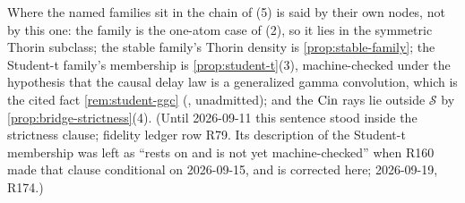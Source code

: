 Where the named families sit in the chain of (5) is said by their own nodes, not by this one: the
\Matern{} family is the one-atom case of (2), so it lies in the symmetric Thorin subclass; the stable
family's Thorin density is \ref{prop:stable-family}; the Student-t family's membership is
\ref{prop:student-t}(3), machine-checked under the hypothesis that the causal delay law is a
generalized gamma convolution, which is the cited fact \ref{rem:student-ggc} (,
unadmitted); and the
$\operatorname{Cin}$ rays lie outside $\mathcal{S}$ by \ref{prop:bridge-strictness}(4). (Until 2026-09-11
this sentence stood inside the strictness clause; fidelity ledger row R79. Its description of the Student-t
membership was left as ``rests on  and is not yet machine-checked'' when R160 made
that clause conditional on 2026-09-15, and is corrected here; 2026-09-19, R174.)

